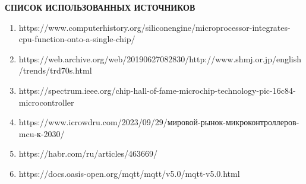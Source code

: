 \documentclass[14pt,a4paper]{extarticle}
\begin{document}
\newpage
\begin{center}
	\textbf{СПИСОК ИСПОЛЬЗОВАННЫХ ИСТОЧНИКОВ}
\end{center}
\begin{enumerate}
	\item\label{1}https://www.computerhistory.org/siliconengine/microprocessor-integrates-cpu-function-onto-a-single-chip/
\item\label{2}https://web.archive.org/web/20190627082830\newline/http://www.shmj.or.jp/english/trends/trd70s.html
	\item\label{3}https://spectrum.ieee.org/chip-hall-of-fame-microchip-technology-pic-16c84-microcontroller
	\item\label{4}https://www.icrowdru.com/2023/09/29/мировой-рынок-микроконтроллеров-mcu-к-2030/
	\item\label{5}https://habr.com/ru/articles/463669/ 
	\item\label{6}https://docs.oasis-open.org/mqtt/mqtt/v5.0/mqtt-v5.0.html
\end{enumerate}



\appendix
	
\end{document}
